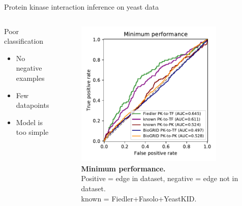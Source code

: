 \begin{frame}{Protein kinase interaction inference on yeast data}
\begin{columns}
\begin{column}{0.5\textwidth}
Poor classification 
\begin{itemize}
    \item No negative examples
    \item Few datapoints
    \item Model is too simple
\end{itemize}
\end{column}

\begin{column}{0.5\textwidth}
\begin{figure}[ht]
    \centering
    \includegraphics[width=0.85\textwidth]{analysis/fig/minimum_performance.pdf}
    \caption{\textbf{Minimum performance.} \\ Positive = edge in dataset, negative = edge not in dataset. \\ known = Fiedler+Fasolo+YeastKID. }
    \label{fig:minimum_performance}
\end{figure}
\end{column}
\end{columns}
\end{frame}
